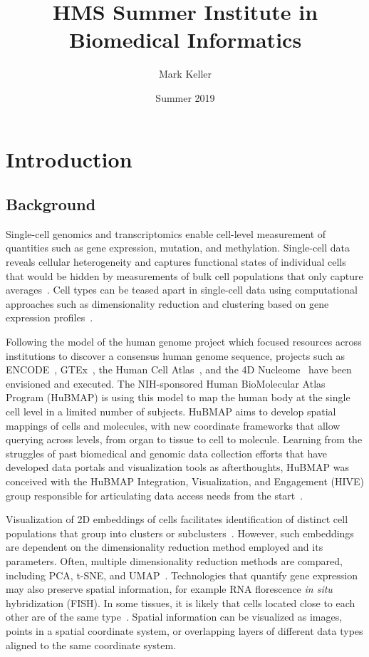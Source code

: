 \documentclass[12pt, letterpaper]{article}
\title{HMS Summer Institute in Biomedical Informatics}
\author{Mark Keller}
\date{Summer 2019}
\begin{document}
\maketitle

\section{Introduction}
\subsection{Background}
Single-cell genomics and transcriptomics enable cell-level measurement of quantities such as gene expression, mutation, and methylation.
Single-cell data reveals cellular heterogeneity and captures functional states of individual cells that would be hidden by measurements of bulk cell populations that only capture averages~\cite{shapiro2013single,nathan2019multimodal}.
Cell types can be teased apart in single-cell data using computational approaches such as dimensionality reduction and clustering based on gene expression profiles~\cite{stegle2015computational,burgess2019spatial}.

Following the model of the human genome project which focused resources across institutions to discover a consensus human genome sequence, projects such as ENCODE~\cite{encode2004encode}, GTEx~\cite{lonsdale2013genotype}, the Human Cell Atlas~\cite{regev2017science}, and the 4D Nucleome~\cite{dekker20174d} have been envisioned and executed.
The NIH-sponsored Human BioMolecular Atlas Program (HuBMAP) is using this model to map the human body at the single cell level in a limited number of subjects.
HuBMAP aims to develop spatial mappings of cells and molecules, with new coordinate frameworks that allow querying across levels, from organ to tissue to cell to molecule.
Learning from the struggles of past biomedical and genomic data collection efforts that have developed data portals and visualization tools as afterthoughts, HuBMAP was conceived with the HuBMAP Integration, Visualization, and Engagement (HIVE) group responsible for articulating data access needs from the start~\cite{snyder2019mapping}.

Visualization of 2D embeddings of cells facilitates identification of distinct cell populations that group into clusters or subclusters~\cite{wang2017visualization,staahl2016visualization}.
However, such embeddings are dependent on the dimensionality reduction method employed and its parameters.
Often, multiple dimensionality reduction methods are compared, including PCA, t-SNE, and UMAP~\cite{ovchinnikova2019exploring,becht2019dimensionality}.
Technologies that quantify gene expression may also preserve spatial information, for example RNA florescence \textit{in situ} hybridization (FISH).
In some tissues, it is likely that cells located close to each other are of the same type~\cite{stegle2015computational}.
Spatial information can be visualized as images, points in a spatial coordinate system, or overlapping layers of different data types aligned to the same coordinate system.
\end{document}

